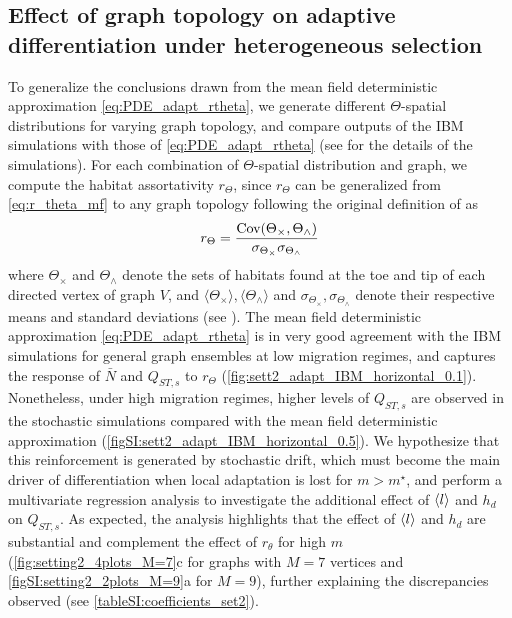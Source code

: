 \subsection{Effect of graph topology on adaptive differentiation under heterogeneous selection}\label{sec:result2b}
To generalize the conclusions drawn from the mean field deterministic approximation \cref{eq:PDE_adapt_rtheta}, we generate different $\Theta$-spatial distributions for varying graph topology, and compare outputs of the IBM simulations with those of \cref{eq:PDE_adapt_rtheta} (see  for the details of the simulations). For each combination of $\Theta$-spatial distribution and graph, we compute the habitat assortativity $r_\Theta$, since $r_\Theta$ can be generalized from \cref{eq:r_theta_mf} to any graph topology following the original definition of \citep{Newman2003a} as
\begin{equation}\label{eq:r_theta}
  r_\Theta = \frac{\mbox{Cov}({ \Theta}_\times, { \Theta}_\wedge)}{\sigma_{{ \Theta}_\times} \sigma_{{ \Theta}_\wedge}}
\end{equation}
where ${ \Theta}_\times$ and ${ \Theta}_\wedge$ denote the sets of habitats found at the toe and tip of each directed vertex of graph $V$, and $\langle { \Theta}_\times \rangle, \langle {\Theta}_\wedge \rangle$ and $\sigma_{{\Theta}_\times}, \sigma_{{\Theta}_\wedge}$ denote their respective means and standard deviations (see ). 
%
The mean field deterministic approximation \cref{eq:PDE_adapt_rtheta} is in very good agreement with the IBM simulations for general graph ensembles at low migration regimes, and captures the response of $\bar{N}$ and $Q_{ST,s}$ to $r_\Theta$ (\cref{fig:sett2_adapt_IBM_horizontal_0.1}). Nonetheless, under high migration regimes, higher levels of $Q_{ST,s}$ are observed in the stochastic simulations compared with the mean field deterministic approximation (\cref{figSI:sett2_adapt_IBM_horizontal_0.5}). We hypothesize that this reinforcement is generated by stochastic drift, which must become the main driver of differentiation when local adaptation is lost for $m>m^\star$, and perform a multivariate regression analysis to investigate the additional effect of $\langle l \rangle$ and $h_d$ on $Q_{ST,s}$. As expected, the analysis highlights that the effect of $\langle l \rangle$ and $h_d$ are substantial and complement the effect of $r_\theta$ for high $m$ (\cref{fig:setting2_4plots_M=7}c for graphs with $M = 7$ vertices and \cref{figSI:setting2_2plots_M=9}a for $M=9$), further explaining the discrepancies observed (see \cref{tableSI:coefficients_set2}).

